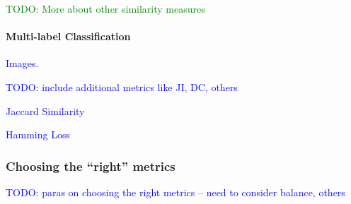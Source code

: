 \textcolor{green}{TODO: More about other similarity measures}




\paragraph{Multi-label Classification}

\textcolor{blue}{Images.}

\textcolor{blue}{TODO: include additional metrics like JI, DC, others}

\textcolor{blue}{Jaccard Similarity}

\textcolor{blue}{Hamming Loss}





\subsubsection{Choosing the ``right'' metrics}

\textcolor{blue}{TODO: paras on choosing the right metrics -- need to consider balance, others}



